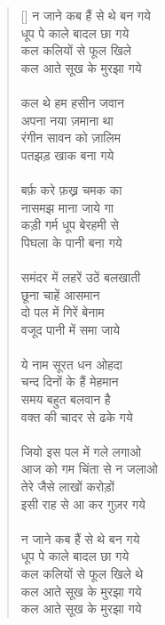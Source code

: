 \begin{verse}[\versewidth]\texthindi{
न जाने कब हैं से थे बन गये\\
धूप पे काले बादल छा गये\\
कल कलियों से फूल खिले\\
कल आते सूख के मुरझा गये\\
\\
कल थे हम हसीन जवान\\
अपना नया ज़माना था\\
रंगीन सावन को ज़ालिम\\
पतझड़ खाक बना गये\\
\\
बर्फ़ करे फ़ख्र चमक का\\
नासमझ माना जाये गा\\
कड़ी गर्म धूप बेरहमी से\\
पिघला के पानी बना गये\\
\\
समंदर में लहरें उठें बलखाती\\
छूना चाहें आसमान\\
दो पल में गिरें बेनाम\\
वजूद पानी में समा जाये\\
\\
ये नाम सूरत धन ओहदा\\
चन्द दिनों के हैं मेहमान\\
समय बहुत बलवान है\\
वक्त की चादर से ढके गये\\
\\
जियो इस पल में गले लगाओ\\
आज को गम चिंता से न जलाओ\\
तेरे जैसे लाखों करोड़ों\\
इसी राह से आ कर गुज़र गये\\
\\
न जाने कब हैं से थे बन गये\\
धूप पे काले बादल छा गये\\
कल कलियों से फूल खिले थे\\
कल आते सूख के मुरझा गये\\
कल आते सूख के मुरझा गये
}\end{verse}

